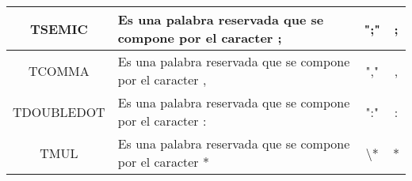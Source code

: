 \documentclass[12pt,a4paper,landscape]{article}
\theoremstyle{mytheor}
\begin{document}
\begin{longtable}[c]{|c|c|c|c|}
TSEMIC       & \multicolumn{1}{l|}{Es una palabra reservada que se compone por el caracter ;}                                                                                                                                                                                                                                                                                                                              & ";"                                                                 & ;                                                                                                                                                                                                                                                \\ \hline
TCOMMA       & \multicolumn{1}{l|}{Es una palabra reservada que se compone por el caracter ,}                                                                                                                                                                                                                                                                                                                              & ","                                                                 & ,                                                                                                                                                                                                                                                \\ \hline
TDOUBLEDOT   & \multicolumn{1}{l|}{Es una palabra reservada que se compone por el caracter :}                                                                                                                                                                                                                                                                                                                              & ":"                                                                 & :                                                                                                                                                                                                                                                \\ \hline
TMUL         & \multicolumn{1}{l|}{Es una palabra reservada que se compone por el caracter *}                                                                                                                                                                                                                                                                                                                              & \textbackslash{}*                                                   & *                                                                                                                                                                                                                                                \\ \hline

\end{longtable}
\end{document}
